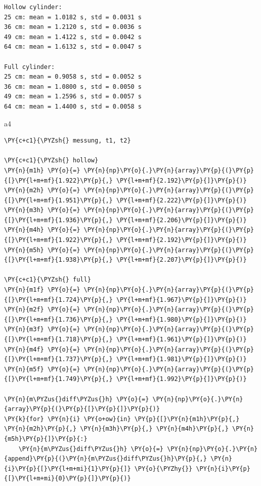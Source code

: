     \begin{Verbatim}[commandchars=\\\{\}]
Hollow cylinder:
25 cm: mean = 1.0182 s, std = 0.0031 s
36 cm: mean = 1.2120 s, std = 0.0036 s
49 cm: mean = 1.4122 s, std = 0.0042 s
64 cm: mean = 1.6132 s, std = 0.0047 s

Full cylinder:
25 cm: mean = 0.9058 s, std = 0.0052 s
36 cm: mean = 1.0800 s, std = 0.0050 s
49 cm: mean = 1.2596 s, std = 0.0057 s
64 cm: mean = 1.4400 s, std = 0.0058 s
    \end{Verbatim}

    a4

    \begin{tcolorbox}[breakable, size=fbox, boxrule=1pt, pad at break*=1mm,colback=cellbackground, colframe=cellborder]
\begin{Verbatim}[commandchars=\\\{\}]
\PY{c+c1}{\PYZsh{} messung, t1, t2}

\PY{c+c1}{\PYZsh{} hollow}
\PY{n}{m1h} \PY{o}{=} \PY{n}{np}\PY{o}{.}\PY{n}{array}\PY{p}{(}\PY{p}{[}\PY{l+m+mf}{1.922}\PY{p}{,} \PY{l+m+mf}{2.192}\PY{p}{]}\PY{p}{)}
\PY{n}{m2h} \PY{o}{=} \PY{n}{np}\PY{o}{.}\PY{n}{array}\PY{p}{(}\PY{p}{[}\PY{l+m+mf}{1.951}\PY{p}{,} \PY{l+m+mf}{2.222}\PY{p}{]}\PY{p}{)}  
\PY{n}{m3h} \PY{o}{=} \PY{n}{np}\PY{o}{.}\PY{n}{array}\PY{p}{(}\PY{p}{[}\PY{l+m+mf}{1.936}\PY{p}{,} \PY{l+m+mf}{2.206}\PY{p}{]}\PY{p}{)}
\PY{n}{m4h} \PY{o}{=} \PY{n}{np}\PY{o}{.}\PY{n}{array}\PY{p}{(}\PY{p}{[}\PY{l+m+mf}{1.922}\PY{p}{,} \PY{l+m+mf}{2.192}\PY{p}{]}\PY{p}{)}
\PY{n}{m5h} \PY{o}{=} \PY{n}{np}\PY{o}{.}\PY{n}{array}\PY{p}{(}\PY{p}{[}\PY{l+m+mf}{1.938}\PY{p}{,} \PY{l+m+mf}{2.207}\PY{p}{]}\PY{p}{)}

\PY{c+c1}{\PYZsh{} full}
\PY{n}{m1f} \PY{o}{=} \PY{n}{np}\PY{o}{.}\PY{n}{array}\PY{p}{(}\PY{p}{[}\PY{l+m+mf}{1.724}\PY{p}{,} \PY{l+m+mf}{1.967}\PY{p}{]}\PY{p}{)}
\PY{n}{m2f} \PY{o}{=} \PY{n}{np}\PY{o}{.}\PY{n}{array}\PY{p}{(}\PY{p}{[}\PY{l+m+mf}{1.736}\PY{p}{,} \PY{l+m+mf}{1.980}\PY{p}{]}\PY{p}{)}
\PY{n}{m3f} \PY{o}{=} \PY{n}{np}\PY{o}{.}\PY{n}{array}\PY{p}{(}\PY{p}{[}\PY{l+m+mf}{1.718}\PY{p}{,} \PY{l+m+mf}{1.961}\PY{p}{]}\PY{p}{)}
\PY{n}{m4f} \PY{o}{=} \PY{n}{np}\PY{o}{.}\PY{n}{array}\PY{p}{(}\PY{p}{[}\PY{l+m+mf}{1.737}\PY{p}{,} \PY{l+m+mf}{1.981}\PY{p}{]}\PY{p}{)}
\PY{n}{m5f} \PY{o}{=} \PY{n}{np}\PY{o}{.}\PY{n}{array}\PY{p}{(}\PY{p}{[}\PY{l+m+mf}{1.749}\PY{p}{,} \PY{l+m+mf}{1.992}\PY{p}{]}\PY{p}{)}

\PY{n}{m\PYZus{}diff\PYZus{}h} \PY{o}{=} \PY{n}{np}\PY{o}{.}\PY{n}{array}\PY{p}{(}\PY{p}{[}\PY{p}{]}\PY{p}{)}
\PY{k}{for} \PY{n}{i} \PY{o+ow}{in} \PY{p}{[}\PY{n}{m1h}\PY{p}{,} \PY{n}{m2h}\PY{p}{,} \PY{n}{m3h}\PY{p}{,} \PY{n}{m4h}\PY{p}{,} \PY{n}{m5h}\PY{p}{]}\PY{p}{:}
    \PY{n}{m\PYZus{}diff\PYZus{}h} \PY{o}{=} \PY{n}{np}\PY{o}{.}\PY{n}{append}\PY{p}{(}\PY{n}{m\PYZus{}diff\PYZus{}h}\PY{p}{,} \PY{n}{i}\PY{p}{[}\PY{l+m+mi}{1}\PY{p}{]} \PY{o}{\PYZhy{}} \PY{n}{i}\PY{p}{[}\PY{l+m+mi}{0}\PY{p}{]}\PY{p}{)}
    

\end{Verbatim}
\end{tcolorbox}
